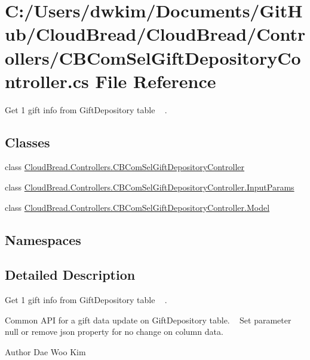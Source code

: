 \hypertarget{a00200}{}\section{C\+:/\+Users/dwkim/\+Documents/\+Git\+Hub/\+Cloud\+Bread/\+Cloud\+Bread/\+Controllers/\+C\+B\+Com\+Sel\+Gift\+Depository\+Controller.cs File Reference}
\label{a00200}


Get 1 gift info from Gift\+Depository table ~\newline
.  


\subsection*{Classes}
\begin{DoxyCompactItemize}
\item 
class \hyperlink{a00027}{Cloud\+Bread.\+Controllers.\+C\+B\+Com\+Sel\+Gift\+Depository\+Controller}
\item 
class \hyperlink{a00114}{Cloud\+Bread.\+Controllers.\+C\+B\+Com\+Sel\+Gift\+Depository\+Controller.\+Input\+Params}
\item 
class \hyperlink{a00164}{Cloud\+Bread.\+Controllers.\+C\+B\+Com\+Sel\+Gift\+Depository\+Controller.\+Model}
\end{DoxyCompactItemize}
\subsection*{Namespaces}
\begin{DoxyCompactItemize}
\end{DoxyCompactItemize}


\subsection{Detailed Description}
Get 1 gift info from Gift\+Depository table ~\newline
. 

Common A\+PI for a gift data update on Gift\+Depository table. ~\newline
Set parameter null or remove json property for no change on column data.

\begin{DoxyAuthor}{Author}
Dae Woo Kim 
\end{DoxyAuthor}

